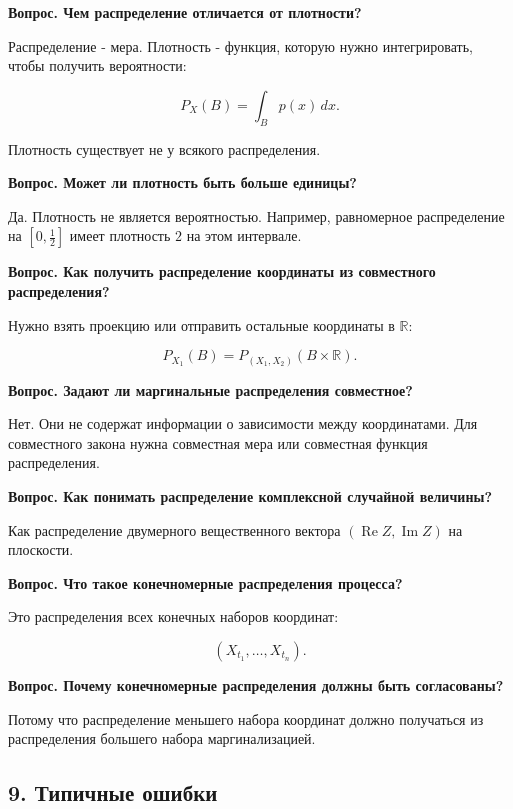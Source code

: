 \documentclass[
  11pt,
  a4paper,
]{article}
\begin{document}
\textbf{Вопрос. Чем распределение отличается от плотности?}

Распределение - мера. Плотность - функция, которую нужно интегрировать,
чтобы получить вероятности:

\[
P_X(B)=\int_Bp(x)\,dx.
\]

Плотность существует не у всякого распределения.

\textbf{Вопрос. Может ли плотность быть больше единицы?}

Да. Плотность не является вероятностью. Например, равномерное
распределение на \([0,\tfrac12]\) имеет плотность \(2\) на этом
интервале.

\textbf{Вопрос. Как получить распределение координаты из совместного
распределения?}

Нужно взять проекцию или отправить остальные координаты в \(\mathbb R\):

\[
P_{X_1}(B)=P_{(X_1,X_2)}(B\times\mathbb R).
\]

\textbf{Вопрос. Задают ли маргинальные распределения совместное?}

Нет. Они не содержат информации о зависимости между координатами. Для
совместного закона нужна совместная мера или совместная функция
распределения.

\textbf{Вопрос. Как понимать распределение комплексной случайной
величины?}

Как распределение двумерного вещественного вектора
\((\operatorname{Re}Z,\operatorname{Im}Z)\) на плоскости.

\textbf{Вопрос. Что такое конечномерные распределения процесса?}

Это распределения всех конечных наборов координат:

\[
(X_{t_1},\ldots,X_{t_n}).
\]

\textbf{Вопрос. Почему конечномерные распределения должны быть
согласованы?}

Потому что распределение меньшего набора координат должно получаться из
распределения большего набора маргинализацией.

\subsection{9. Типичные
ошибки}\label{ux442ux438ux43fux438ux447ux43dux44bux435-ux43eux448ux438ux431ux43aux438}
\end{document}
